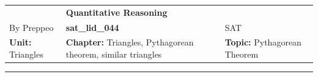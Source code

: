 \documentclass[11pt,paper=a4,answers]{exam}
\begin{document}
\begin{center}
    \centering
    \renewcommand{\arraystretch}{1.5}
    \begin{tabularx}{\textwidth}{YYY}
    & \normalsize\bf{{\Large{{Quantitative Reasoning}}}} & \\
    By Preppeo & \normalsize\bf{{sat\_lid\_044}} & SAT\\
    \normalsize{{\textbf{{Unit:}} Triangles}} & \normalsize{{\textbf{{Chapter:}} Triangles, Pythagorean theorem, similar triangles}} & \normalsize{{\textbf{{Topic:}} Pythagorean Theorem}} \\
    \end{tabularx}
\end{center}
\par\noindent\rule{\textwidth}{1pt}
\end{document}

